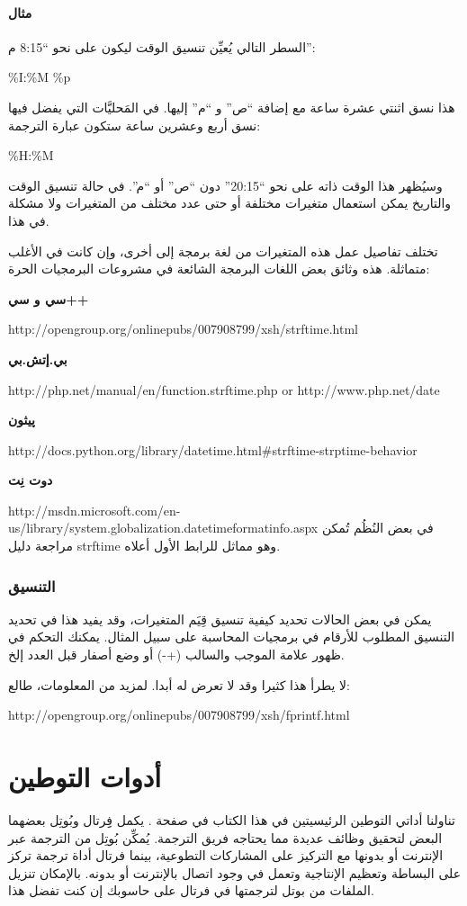 \subsubsection{مثال}
السطر التالي يُعيِّن تنسيق الوقت ليكون على نحو “8:15 م”:

\%I:\%M \%p

هذا نسق اثنتي عشرة ساعة مع إضافة “ص” و “م” إليها. في المَحليَّات التي
يفضل فيها نسق أربع وعشرين ساعة ستكون عبارة الترجمة:

\%H:\%M

وسيُظهر هذا الوقت ذاته على نحو “20:15” دون “ص” أو “م”. في حالة تنسيق
الوقت والتاريخ يمكن استعمال متغيرات مختلفة أو حتى عدد مختلف من
المتغيرات ولا مشكلة في هذا.

تختلف تفاصيل عمل هذه المتغيرات من لغة برمجة إلى أخرى، وإن كانت في الأغلب
متماثلة. هذه وثائق بعض اللغات البرمجة الشائعة في مشروعات البرمجيات
الحرة:

\startitemize[1]
\item {\bf
سي و سي++}

http://opengroup.org/onlinepubs/007908799/xsh/strftime.html
\item {\bf
بي.إتش.بي}

http://php.net/manual/en/function.strftime.php  or 
http://www.php.net/date
\item {\bf
پيثون}

http://docs.python.org/library/datetime.html\#strftime-strptime-behavior
\item {\bf
دوت نِت}

http://msdn.microsoft.com/en-us/library/system.globalization.datetimeformatinfo.aspx
\stopitemize
في بعض النُظُم تُمكن مراجعة دليل strftime وهو مماثل للرابط الأول أعلاه.

\subsection{التنسيق}
يمكن في بعض الحالات تحديد كيفية تنسيق قِيَم المتغيرات، وقد يفيد هذا في
تحديد التنسيق المطلوب للأرقام في برمجيات المحاسبة على سبيل المثال.
يمكنك التحكم في ظهور علامة الموجب والسالب (+ -) أو وضع
أصفار قبل العدد إلخ.

لا يطرأ هذا كثيرا وقد لا تعرض له أبدا. لمزيد من المعلومات، طالع:

http://opengroup.org/onlinepubs/007908799/xsh/fprintf.html

\chapter[ref:30364807]{أدوات التوطين}
تناولنا أداتي التوطين الرئيسيتين
في هذا الكتاب في صفحة \at[ref:20165030]. يكمل فِِرتال وبُوتِل
بعضهما البعض لتحقيق وظائف عديدة مما يحتاجه فريق الترجمة. يُمكِّن بُوتِل
من الترجمة عبر الإنترنت أو بدونها مع التركيز على المشاركات التطوعية،
بينما فرتال أداة ترجمة تركز على البساطة وتعظيم الإنتاجية وتعمل في وجود
اتصال بالإنترنت أو بدونه. بالإمكان تنزيل الملفات من بوتل لترجمتها في
فرتال على حاسوبك إن كنت تفضل هذا.


